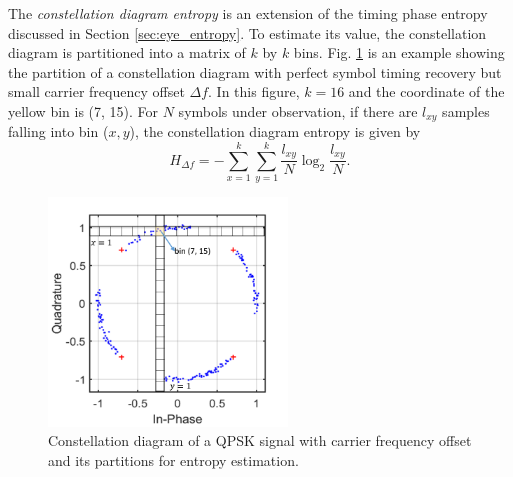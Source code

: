 \documentclass[journal,comsoc]{IEEEtran}
\begin{document}
The \textit{constellation diagram entropy} is an extension of the timing phase entropy discussed in Section \ref{sec:eye_entropy}.
To estimate its value, the constellation diagram is partitioned into a matrix of \(k\) by \(k\) bins.
Fig. \ref{fig:const_entropy} is an example showing the partition of a constellation diagram with perfect symbol timing recovery but small carrier frequency offset \(\Delta f\). 
In this figure, \(k=16\) and  the coordinate of the yellow bin is (7, 15).
For \(N\) symbols under observation, if there are \(l_{xy}\) samples falling into bin ($x, y$), the constellation diagram entropy is given by
\begin{equation}
H_{\Delta f} =  -\sum\limits_{x=1}^k \sum\limits_{y = 1}^k {\frac{l_{xy}}{N}\log_2 \frac{l_{xy}}{N}}.
\label{eq:entropy_const}
\end{equation}
\begin{figure}[htbp]
\centering
\includegraphics[width=2.5in]{const_ent.png}
\caption{Constellation diagram of a QPSK signal with carrier frequency offset and its partitions for entropy estimation.}
\label{fig:const_entropy} 
\end{figure}


\end{document}
